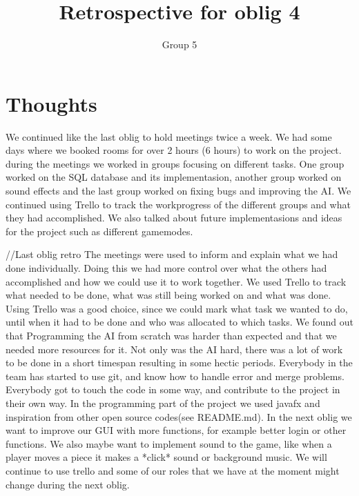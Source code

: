 \documentclass{article}
\title{Retrospective for oblig 4}
\author{Group 5}
\date{}
\begin{document}
    \maketitle

    \section{Thoughts}
    \noindent
     We continued like the last oblig to hold meetings twice a week. We had some days where we booked rooms for over 2 hours (6 hours) to work on the project.
     during the meetings we worked in groups focusing on different tasks. One group worked on the SQL database and its implementasion, another group worked on sound effects
     and the last group worked on fixing bugs and improving the AI. We continued using Trello to track the workprogress of the different groups and what they had accomplished.
     We also talked about future implementasions and ideas for the project such as different gamemodes.




     //Last oblig retro
      The meetings were used to inform and explain what we had
     done individually. Doing this we had more control over what the others had accomplished and how we could use it to work together.
     We used Trello to track what needed to be done, what was still being worked on and what was done. Using Trello was a good choice, since we could mark what task we
     wanted to do, until when it had to be done and who was allocated to which tasks. We found out that Programming the AI from scratch was harder than expected
     and that we needed more resources for it. Not only was the AI hard, there was a lot of work to be done in a short timespan
     resulting in some hectic periods. Everybody in the team has started to use git, and know how to handle error and merge problems.
     Everybody got to touch the code in some way, and contribute to the project in their own way. In the programming part of the project
     we used javafx and inspiration from other open source codes(see README.md). In the next oblig we want to
     improve our GUI with more functions, for example better login or other functions. We also maybe want to implement sound to the game, like when a player moves a piece it makes a *click* sound or background music. We will continue to use trello and some of our roles that we have at the moment might change during the next oblig.
\end{document}
